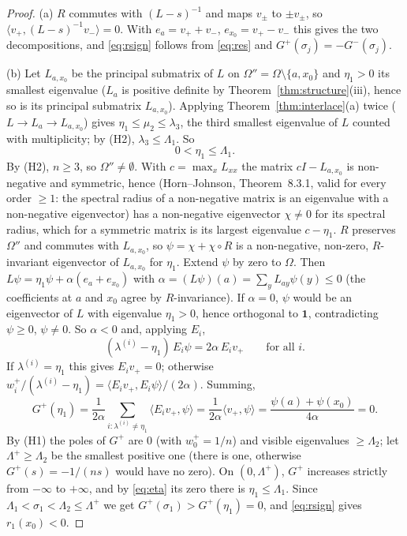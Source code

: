 \documentclass[11pt,a4paper]{article}
\newcommand{\one}{\mathbf 1}
\newcommand{\ip}[2]{\langle #1,#2\rangle}
\theoremstyle{plain}
\theoremstyle{definition}
\numberwithin{equation}{section}
\begin{document}
\begin{proof}
(a) $R$ commutes with $(L-s)^{-1}$ and maps $v_\pm$ to $\pm v_\pm$, so $\ip{v_+}{(L-s)^{-1}v_-}=0$. With $e_a=v_++v_-$, $e_{x_0}=v_+-v_-$ this gives the two decompositions, and \eqref{eq:rsign} follows from \eqref{eq:res} and $G^+(\sigma_j)=-G^-(\sigma_j)$.

(b) Let $L_{a,x_0}$ be the principal submatrix of $L$ on $\Omega''=\Omega\setminus\{a,x_0\}$ and $\eta_1>0$ its smallest eigenvalue ($L_a$ is positive definite by Theorem~\ref{thm:structure}(iii), hence so is its principal submatrix $L_{a,x_0}$). Applying Theorem~\ref{thm:interlace}(a) twice ($L\to L_a\to L_{a,x_0}$) gives $\eta_1\le\mu_2\le\lambda_3$, the third smallest eigenvalue of $L$ counted with multiplicity; by (H2), $\lambda_3\le\Lambda_1$. So
\begin{equation}\label{eq:eta}
0<\eta_1\le\Lambda_1 .
\end{equation}
By (H2), $n\ge3$, so $\Omega''\ne\emptyset$. With $c=\max_xL_{xx}$ the matrix $cI-L_{a,x_0}$ is non-negative and symmetric, hence (Horn--Johnson, Theorem~8.3.1, valid for every order $\ge1$: the spectral radius of a non-negative matrix is an eigenvalue with a non-negative eigenvector) has a non-negative eigenvector $\chi\ne0$ for its spectral radius, which for a symmetric matrix is its largest eigenvalue $c-\eta_1$. $R$ preserves $\Omega''$ and commutes with $L_{a,x_0}$, so $\psi=\chi+\chi\circ R$ is a non-negative, non-zero, $R$-invariant eigenvector of $L_{a,x_0}$ for $\eta_1$. Extend $\psi$ by zero to $\Omega$. Then $L\psi=\eta_1\psi+\alpha(e_a+e_{x_0})$ with $\alpha=(L\psi)(a)=\sum_yL_{ay}\psi(y)\le0$ (the coefficients at $a$ and $x_0$ agree by $R$-invariance). If $\alpha=0$, $\psi$ would be an eigenvector of $L$ with eigenvalue $\eta_1>0$, hence orthogonal to $\one$, contradicting $\psi\ge0$, $\psi\ne0$. So $\alpha<0$ and, applying $E_i$,
\[
(\lambda^{(i)}-\eta_1)\,E_i\psi=2\alpha\,E_iv_+\qquad\text{for all }i .
\]
If $\lambda^{(i)}=\eta_1$ this gives $E_iv_+=0$; otherwise $w_i^+/(\lambda^{(i)}-\eta_1)=\ip{E_iv_+}{E_i\psi}/(2\alpha)$. Summing,
\[
G^+(\eta_1)=\frac1{2\alpha}\sum_{i:\lambda^{(i)}\ne\eta_1}\ip{E_iv_+}{\psi}=\frac1{2\alpha}\ip{v_+}{\psi}=\frac{\psi(a)+\psi(x_0)}{4\alpha}=0 .
\]
By (H1) the poles of $G^+$ are $0$ (with $w_0^+=1/n$) and visible eigenvalues $\ge\Lambda_2$; let $\Lambda^+\ge\Lambda_2$ be the smallest positive one (there is one, otherwise $G^+(s)=-1/(ns)$ would have no zero). On $(0,\Lambda^+)$, $G^+$ increases strictly from $-\infty$ to $+\infty$, and by \eqref{eq:eta} its zero there is $\eta_1\le\Lambda_1$. Since $\Lambda_1<\sigma_1<\Lambda_2\le\Lambda^+$ we get $G^+(\sigma_1)>G^+(\eta_1)=0$, and \eqref{eq:rsign} gives $r_1(x_0)<0$.
\end{proof}
\end{document}
